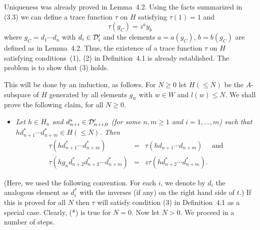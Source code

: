 \begin{pf} Uniqueness was already proved in Lemma~4.2. Using the facts 
summarized  in  (3.3) we can  define  a  trace function  $\tau$ on $H$
satisfying $\tau(1)=1$ and \[ \tau(g_C)=z^ay_b\] where $g_C=d_1 \cdots
d_n$   with   $d_i  \in  {\cal D}_i'$   and   the elements $a=a(g_C)$,
$b=b(g_C)$ are defined as in Lemma~4.2. Thus, the existence of a trace
function  $\tau$    on   $H$   satisfying   conditions~(1),  (2)    in
Definition~4.1 is already established. The problem is to show that (3)
holds.

This will  be done by an  induction, as follows.   For $N \geq  0$ let
$H(\leq N)$ be the $A$-subspace of $H$ generated by all elements $g_w$
with $w \in W$ and $l(w) \leq N$. We  shall prove the following claim,
for all $N \geq 0$.
\begin{itemize}
\item[(*)] {\em Let $h \in H_n$ and $d_{n+i}^{*} \in  
{\cal D}_{n+i,0}'$ (for some $n,m \geq 1$ and $i=1,\ldots,m$) such that 
$hd_{n+1}^{*}\cdots d_{n+m}^{*} \in H(\leq N)$.
Then} 
\begin{eqnarray*}
\tau(hd_{n+1}^{*} \cdots d_{n+m}^{*}) & = & \tau(hd_{n+1} \cdots 
d_{n+m}) \quad \mbox{ and} \\
\tau(hg_nd_{n+2}^{*}d_{n+3}^{*} \cdots d_{n+m}^{*}) & = & z\tau(hd_{n+2}^{*} 
\cdots d_{n+m}^{*}). \end{eqnarray*} 
\end{itemize}
(Here, we used  the following convention. For each  $i$, we  denote by
$d_i$ the analogous element as $d_i^{*}$ with the inverses (if any) on
the right hand side of $t$.) If this is proved for all $N$ then $\tau$
will   satisfy condition  (3)    in    Definition~4.1 as a     special
case. Clearly, (*) is true  for $N=0$. Now  let $N>0$. We proceed in a
number of steps.


\end{pf}

